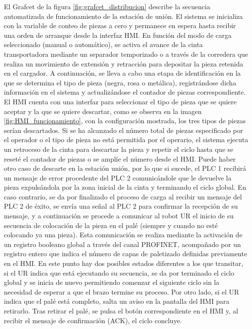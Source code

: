 El Grafcet de la figura \ref{fig:grafcet_distribucion} describe la secuencia automatizada de funcionamiento de la estación de unión. El sistema se inicializa con la variable de conteo de piezas a cero y permanece en espera hasta recibir una orden de arranque desde la interfaz HMI. En función del modo de carga seleccionado (manual o automático), se activa el avance de la cinta transportadora mediante un separador temporizado o a través de la corredera que realiza un movimiento de extensión y retracción para depositar la pieza retenida en el cargador. A continuación, se lleva a cabo una etapa de identificación en la que se determina el tipo de pieza (negra, rosa o metálica), registrándose dicha información en el sistema y actualizándose el contador de piezas correspondiente. El HMI cuenta con una interfaz para seleccionar el tipo de pieza que se quiere aceptar y la que se quiere descartar, como se observa en la imagen \ref{fig:HMI_funcionamiento}, con la configuración mostrada, los tres tipos de piezas serían descartados. Si se ha alcanzado el número total de piezas especificado por el operador o el tipo de pieza no está permitida por el operario, el sistema ejecuta un retroceso de la cinta para descartar la pieza y repetir el ciclo hasta que se reseté el contador de piezas o se amplíe el número desde el HMI. Puede haber otro caso de descarte en la estación unión, por lo que si sucede, el PLC 1 recibirá un mensaje de error procedente del PLC 2 comunicándole que le devuelve la pieza expulsándola por la zona inicial de la cinta y terminando el ciclo global. En caso contrario, se da por finalizado el proceso de carga al recibir un mensaje del PLC 2 de éxito, se envía una señal al PLC 2 para confirmar la recepción de su mensaje, y a continuación se procede a comunicar al robot UR el inicio de su secuencia de colocación de la pieza en el palé (siempre y cuando no esté colocando ya una pieza). Esta comunicación se realiza mediante la activación de un registro booleano global a través del canal PROFINET, acompañado por un registro entero que indica el número de capas de paletizado definidas previamente en el HMI. En este punto hay dos posibles estados diferentes a los que transitar, si el UR indica que está ejecutando su secuencia, se da por terminado el ciclo global y se inicia de nuevo permitiendo comenzar el siguiente ciclo sin la necesidad de esperar a que el brazo termine su proceso. Por otro lado, si el UR indica que el palé está completo, salta un aviso en la pantalla del HMI para retirarlo. Tras retirar el palé, se pulsa el botón correspondiente en el HMI y, al recibir el mensaje de confirmación (ACK), el ciclo concluye.

